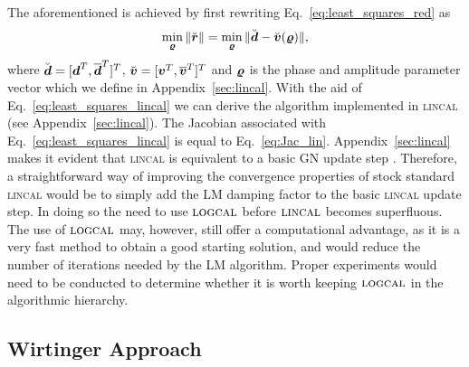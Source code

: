 \documentclass[useAMS,usenatbib]{mn2e}
\newcommand{\bz}{\bmath{z}}
\newcommand{\br}{\bmath{r}}
\newcommand{\bg}{\bmath{g}}
\newcommand{\bd}{\bmath{d}}
\newcommand{\bv}{\bmath{v}}
\newcommand{\by}{\bmath{y}}
\newcommand{\conj}[1]{\overline{#1}}
\begin{document}
The aforementioned is achieved by first rewriting Eq.~\eqref{eq:least_squares_red} as
\begin{equation}
\label{eq:least_squares_lincal}
\min_{\bmath{\varrho}} \|\breve{\br}\| = \min_{\bmath{\varrho}} \|\breve{\bd} - \breve{\bv}(\bmath{\varrho})\|, 
\end{equation}
where $\breve{\bd} = [\bd^T,\conj{\bd}^T]^T$, $\breve{\bv} = [\bv^T,\conj{\bv}^T]^T$ and $\bmath{\varrho}$ is the phase and amplitude parameter vector which we define in Appendix~\ref{sec:lincal}. 
With the aid of Eq.~\eqref{eq:least_squares_lincal} we can derive the algorithm implemented in \textsc{lincal} (see Appendix~\ref{sec:lincal}).
The Jacobian associated with Eq.~\eqref{eq:least_squares_lincal} is equal to Eq.~\eqref{eq:Jac_lin}. 
Appendix~\ref{sec:lincal} makes it evident that \textsc{lincal} is equivalent to a basic GN update step \citep{Kurien2016}. 
Therefore, a straightforward way of improving the convergence properties of stock standard \textsc{lincal} would be to simply add the LM damping factor to the basic \textsc{lincal} update step.
In doing so the need to use $\textsc{logcal}$ before $\textsc{lincal}$ becomes superfluous. The use of $\textsc{logcal}$ may, however, still offer 
a computational advantage, as it is a very fast method to obtain a good starting solution, and would reduce the number of iterations needed by the LM algorithm.
Proper experiments would need to be conducted to determine whether it is worth keeping $\textsc{logcal}$ in the algorithmic hierarchy. 

\subsection{Wirtinger Approach}
\label{sec:w}

\end{document}
